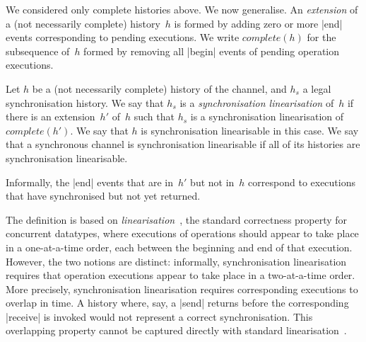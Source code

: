 We considered only complete histories above.  We now generalise.  An
\emph{extension} of a (not necessarily complete) history~$h$ is formed by
adding zero or more |end| events corresponding to pending executions.  We
write $complete(h)$ for the subsequence of~$h$ formed by removing all |begin|
events of pending operation executions.
%
\begin{definition}
Let $h$ be a (not necessarily complete) history of the channel, and $h_s$ a
legal synchronisation history.  We say that $h_s$ is a \emph{synchronisation
  linearisation} of~$h$ if there is an extension~$h'$ of~$h$ such that $h_s$
is a synchronisation linearisation of $complete(h')$.  We say that $h$ is
synchronisation linearisable in this case.
%
We say that a synchronous channel is synchronisation linearisable if all of
its histories are synchronisation linearisable.
\end{definition}
%
Informally, the |end| events that are in~$h'$ but not in~$h$ correspond to
executions that have synchronised but not yet returned.



The definition is based on \emph{linearisation}~\cite{herlihy-wing}, the
standard correctness property for concurrent datatypes, where executions of
operations should appear to take place in a one-at-a-time order, each between
the beginning and end of that execution.  However, the two notions are
distinct: informally, synchronisation linearisation requires that operation
executions appear to take place in a two-at-a-time order.  More precisely,
synchronisation linearisation requires corresponding executions to overlap in
time.  A history where, say, a |send| returns before the corresponding
|receive| is invoked would not represent a correct synchronisation.  This
overlapping property cannot be captured directly with standard
linearisation~\cite{LL:synchronisation}.


